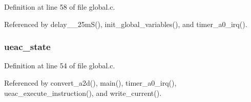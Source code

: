 Definition at line 58 of file global.c.

Referenced by delay\_\_\-25m\-S(), init\_\-global\_\-variables(), and timer\_\-a0\_\-irq().
\subsubsection{ {\bf ueac\_\-state}}\label{global_8h_a0}




Definition at line 54 of file global.c.

Referenced by convert\_\-a2d(), main(), timer\_\-a0\_\-irq(), ueac\_\-execute\_\-instruction(), and write\_\-current().